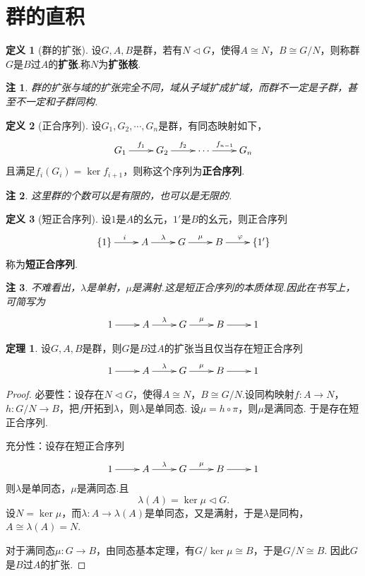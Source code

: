 \documentclass[12pt]{ctexart}
\theoremstyle{definition}
\newtheorem{definition}{定义}[section]
\newtheorem{theorem}{定理}[section]
\theoremstyle{plain}
\newtheorem*{remark}{注}
\begin{document}
\section{群的直积}
	\begin{definition}[群的扩张]
	设$G,A,B$是群，若有$N\lhd G$，使得$A\cong N$，$B\cong G/N$，则称群$G$是$B$过$A$的\textbf{扩张}.称$N$为\textbf{扩张核}.
\end{definition}
\begin{remark}
	群的扩张与域的扩张完全不同，域从子域扩成扩域，而群不一定是子群，甚至不一定和子群同构.
\end{remark}
\begin{definition}[正合序列]
	设$G_1,G_2,\cdots,G_n$是群，有同态映射如下，
	\begin{displaymath}
		\xymatrix{
			G_1\ar[r]^{f_1} & G_2\ar[r]^{f_2} & \cdots\ar[r]^{f_{n-1}} & G_n
		}
	\end{displaymath}
	且满足$f_i(G_i)=\ker f_{i+1}$，则称这个序列为\textbf{正合序列}.
\end{definition}
\begin{remark}
	这里群的个数可以是有限的，也可以是无限的.
\end{remark}
\begin{definition}[短正合序列]
	设$1$是$A$的幺元，$1'$是$B$的幺元，则正合序列
	\begin{displaymath}
		\xymatrix{
			\{1\}\ar[r]^{i} & A\ar[r]^{\lambda} & G\ar[r]^{\mu} & B\ar[r]^{\varphi} & \{1'\}
		}
	\end{displaymath}
	称为\textbf{短正合序列}.
\end{definition}
\begin{remark}
	不难看出，$\lambda$是单射，$\mu$是满射.这是短正合序列的本质体现.因此在书写上，可简写为
	\begin{displaymath}
		\xymatrix{
			1\ar[r] & A\ar[r]^{\lambda} & G\ar[r]^{\mu} & B\ar[r] & 1
		}
	\end{displaymath}
\end{remark}
\begin{theorem}\label{iffshort}
	设$G,A,B$是群，则$G$是$B$过$A$的扩张当且仅当存在短正合序列
	\begin{displaymath}
		\xymatrix{
			1\ar[r] & A\ar[r]^{\lambda} & G\ar[r]^{\mu} & B\ar[r] & 1
		}
	\end{displaymath}
\end{theorem}
\begin{proof}
	必要性：设存在$N\lhd G$，使得$A\cong N$，$B\cong G/N$.设同构映射$f:A\to N$，$h:G/N\to B$，把$f$开拓到$\lambda$，则$\lambda$是单同态. 设$\mu=h\circ \pi$，则$\mu$是满同态. 于是存在短正合序列.
	
	充分性：设存在短正合序列
	\begin{displaymath}
		\xymatrix{
			1\ar[r] & A\ar[r]^{\lambda} & G\ar[r]^{\mu} & B\ar[r] & 1
		}
	\end{displaymath}
	则$\lambda$是单同态，$\mu$是满同态.且
	$$\lambda(A)=\ker\mu\lhd G.$$
	设$N=\ker\mu$，而$\lambda:A\to\lambda(A)$是单同态，又是满射，于是$\lambda$是同构，$A\cong\lambda(A)=N$.
	
	对于满同态$\mu:G\to B$，由同态基本定理，有$G/\ker\mu\cong B$，于是$G/N\cong B$. 因此$G$是$B$过$A$的扩张.
\end{proof}
\end{document}
